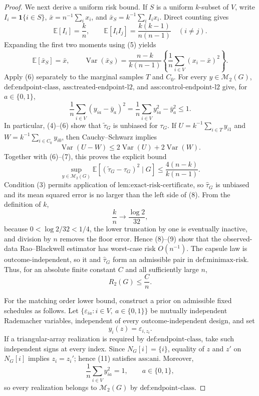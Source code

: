\documentclass{article}
\begin{document}
\begin{proof}
We next derive a uniform risk bound.  If \(S\) is a uniform \(k\)-subset of \(V\), write \(I_i=\mathbf 1\{i\in S\}\), \(\bar x=n^{-1}\sum_i x_i\), and \(\bar x_S=k^{-1}\sum_i I_ix_i\).  Direct counting gives
\[
 \mathbb E[I_i]=\frac{k}{n},\qquad
 \mathbb E[I_iI_j]=\frac{k(k-1)}{n(n-1)}\quad(i\ne j). \tag{5}
\]
Expanding the first two moments using (5) yields
\[
 \mathbb E[\bar x_S]=\bar x,
 \qquad
 \operatorname{Var}(\bar x_S)
 =\frac{n-k}{k(n-1)}
   \left\{\frac1n\sum_{i\in V}(x_i-\bar x)^2\right\}. \tag{6}
\]
Apply (6) separately to the marginal samples \(T\) and \(C_0\).  For every \(y\in\mathcal M_2(G)\), \(\text{def:endpoint-class}\), \(\text{ass:treated-endpoint-l2}\), and \(\text{ass:control-endpoint-l2}\) give, for \(a\in\{0,1\}\),
\[
 \frac1n\sum_{i\in V}(y_{ia}-\bar y_a)^2
 =\frac1n\sum_{i\in V}y_{ia}^2-\bar y_a^2
 \le 1. \tag{7}
\]
In particular, (4)--(6) show that \(\widetilde\tau_G\) is unbiased for \(\tau_G\).  If \(U=k^{-1}\sum_{i\in T}y_{i1}\) and \(W=k^{-1}\sum_{i\in C_0}y_{i0}\), then Cauchy--Schwarz implies
\[
 \operatorname{Var}(U-W)
 \le 2\operatorname{Var}(U)+2\operatorname{Var}(W).
\]
Together with (6)--(7), this proves the explicit bound
\[
 \sup_{y\in\mathcal M_2(G)}
 \mathbb E[(\widetilde\tau_G-\tau_G)^2\mid G]
 \le \frac{4(n-k)}{k(n-1)}. \tag{8}
\]
Condition (3) permits application of \(\text{lem:exact-risk-certificate}\), so \(\widehat\tau_G\) is unbiased and its mean squared error is no larger than the left side of (8).  From the definition of \(k\),
\[
 \frac{k}{n}\longrightarrow\frac{\log 2}{32}, \tag{9}
\]
because \(0<\log 2/32<1/4\), the lower truncation by one is eventually inactive, and division by \(n\) removes the floor error.  Hence (8)--(9) show that the observed-data Rao--Blackwell estimator has worst-case risk \(O(n^{-1})\).  The capsule law is outcome-independent, so it and \(\widehat\tau_G\) form an admissible pair in \(\text{def:minimax-risk}\).  Thus, for an absolute finite constant \(C\) and all sufficiently large \(n\),
\[
 R_2(G)\le \frac Cn. \tag{10}
\]

For the matching order lower bound, construct a prior on admissible fixed schedules as follows.  Let \(\{\varepsilon_{ia}:i\in V,\ a\in\{0,1\}\}\) be mutually independent Rademacher variables, independent of every outcome-independent design, and set
\[
 y_i(z)=\varepsilon_{i,z_i}. \tag{11}
\]
If a triangular-array realization is required by \(\text{def:endpoint-class}\), take such independent signs at every index.  Since \(N_G[i]=\{i\}\), equality of \(z\) and \(z'\) on \(N_G[i]\) implies \(z_i=z_i'\); hence (11) satisfies \(\text{ass:ani}\).  Moreover,
\[
 \frac1n\sum_{i\in V}y_{ia}^2=1,
 \qquad a\in\{0,1\}, \tag{12}
\]
so every realization belongs to \(\mathcal M_2(G)\) by \(\text{def:endpoint-class}\).


\end{proof}
\end{document}
